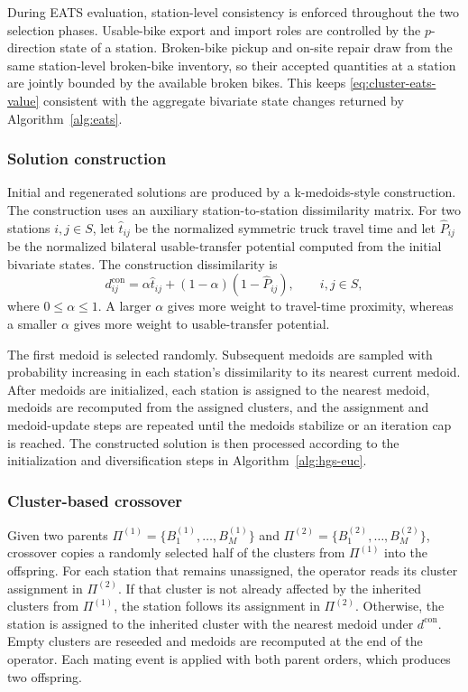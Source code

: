During EATS evaluation, station-level consistency is enforced throughout the two
selection phases. Usable-bike export and import roles are controlled by the
$p$-direction state of a station. Broken-bike pickup and on-site repair draw
from the same station-level broken-bike inventory, so their accepted quantities
at a station are jointly bounded by the available broken bikes. This keeps
\eqref{eq:cluster-eats-value} consistent with the aggregate bivariate state
changes returned by Algorithm~\ref{alg:eats}.

\subsubsection{Solution construction}\label{sec:hgs-euc-construction}

Initial and regenerated solutions are produced by a k-medoids-style construction.
The construction uses an auxiliary station-to-station dissimilarity matrix. For
two stations $i,j\in S$, let $\hat t_{ij}$ be the normalized symmetric truck
travel time and let $\hat P_{ij}$ be the normalized bilateral usable-transfer
potential computed from the initial bivariate states. The construction
dissimilarity is
\begin{equation}
d_{ij}^{\mathrm{con}}
=\alpha \hat t_{ij}+(1-\alpha)(1-\hat P_{ij}),
\qquad i,j\in S,
\label{eq:construction-dissimilarity}
\end{equation}
where $0\le \alpha\le 1$. A larger $\alpha$ gives more weight to travel-time
proximity, whereas a smaller $\alpha$ gives more weight to usable-transfer
potential.

The first medoid is selected randomly. Subsequent medoids are sampled with
probability increasing in each station's dissimilarity to its nearest current
medoid. After medoids are initialized, each station is assigned to the nearest
medoid, medoids are recomputed from the assigned clusters, and the assignment and
medoid-update steps are repeated until the medoids stabilize or an iteration cap
is reached. The constructed solution is then processed according to the
initialization and diversification steps in Algorithm~\ref{alg:hgs-euc}.

\subsubsection{Cluster-based crossover}\label{sec:hgs-euc-crossover}

Given two parents $\Pi^{(1)}=\{B_1^{(1)},\ldots,B_M^{(1)}\}$ and
$\Pi^{(2)}=\{B_1^{(2)},\ldots,B_M^{(2)}\}$, crossover copies a randomly selected
half of the clusters from $\Pi^{(1)}$ into the offspring. For each station that
remains unassigned, the operator reads its cluster assignment in $\Pi^{(2)}$. If
that cluster is not already affected by the inherited clusters from
$\Pi^{(1)}$, the station follows its assignment in $\Pi^{(2)}$. Otherwise, the
station is assigned to the inherited cluster with the nearest medoid under
$d^{\mathrm{con}}$. Empty clusters are reseeded and medoids are recomputed at the
end of the operator. Each mating event is applied with both parent orders, which
produces two offspring.

